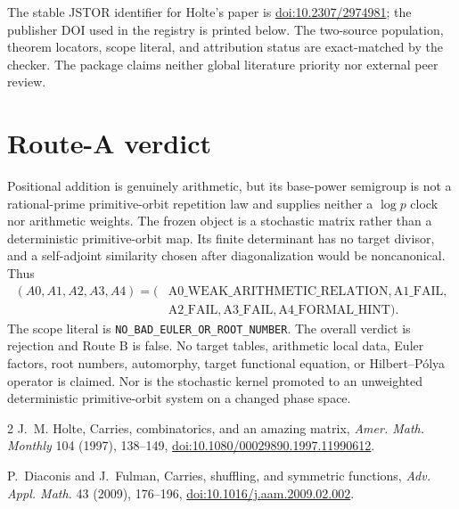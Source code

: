 \documentclass[9pt]{extarticle}
\begin{document}
The stable JSTOR identifier for Holte's paper is
\href{https://doi.org/10.2307/2974981}{doi:10.2307/2974981}; the publisher DOI
used in the registry is printed below.  The two-source population, theorem
locators, scope literal, and attribution status are exact-matched by the
checker.  The package claims neither global literature priority nor external
peer review.

\section{Route-A verdict}
Positional addition is genuinely arithmetic, but its base-power semigroup is
not a rational-prime primitive-orbit repetition law and supplies neither a
$\log p$ clock nor arithmetic weights.  The frozen object is a stochastic matrix rather than a deterministic
primitive-orbit map.  Its finite determinant has no target divisor, and a
self-adjoint similarity chosen after diagonalization would be noncanonical.
Thus
\[
\begin{aligned}
(A0,A1,A2,A3,A4)=(&\mathrm{A0\_WEAK\_ARITHMETIC\_RELATION},
\mathrm{A1\_FAIL},\\
&\mathrm{A2\_FAIL},\mathrm{A3\_FAIL},\mathrm{A4\_FORMAL\_HINT}).
\end{aligned}
\]
The scope literal is \texttt{NO\_BAD\_EULER\_OR\_ROOT\_NUMBER}.
The overall verdict is rejection and Route B is false.  No target tables,
arithmetic local data, Euler factors, root numbers, automorphy, target
functional equation, or Hilbert--P\'olya operator is claimed.  Nor is the
stochastic kernel promoted to an unweighted deterministic primitive-orbit
system on a changed phase space.

\begin{thebibliography}{2}
J.~M. Holte,
\newblock Carries, combinatorics, and an amazing matrix,
\newblock \emph{Amer. Math. Monthly} 104 (1997), 138--149,
\newblock \href{https://doi.org/10.1080/00029890.1997.11990612}{doi:10.1080/00029890.1997.11990612}.

P.~Diaconis and J.~Fulman,
\newblock Carries, shuffling, and symmetric functions,
\newblock \emph{Adv. Appl. Math.} 43 (2009), 176--196,
\newblock \href{https://doi.org/10.1016/j.aam.2009.02.002}{doi:10.1016/j.aam.2009.02.002}.
\end{thebibliography}
\end{document}
